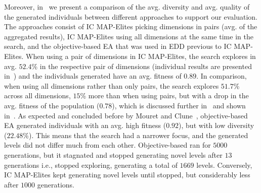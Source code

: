 Moreover, in~ we present a comparison of the avg. diversity and avg. quality of the generated individuals between different approaches to support our evaluation. The approaches consist of IC MAP-Elites picking dimensions in pairs (avg. of the aggregated results), IC MAP-Elites using all dimensions at the same time in the search, and the objective-based EA that was used in EDD previous to IC MAP-Elites. When using a pair of dimensions in IC MAP-Elites, the search explores in avg. $52.4$\% in the respective pair of dimensions (individual results are presented in~) and the individuals generated have an avg. fitness of $0.89$. In comparison, when using all dimensions rather than only pairs, the search explores $51.7$\% across all dimensions, $15$\% more than when using pairs, but with a drop in the avg. fitness of the population ($0.78$), which is discussed further in~ and shown in~. As expected and concluded before by Mouret and Clune~\cite{p6Mouret2015}, objective-based EA generated individuals with an avg. high fitness ($0.92$), but with low diversity ($22.48$\%). This means that the search had a narrower focus, and the generated levels did not differ much from each other. Objective-based ran for $5000$ generations, but it stagnated and stopped generating novel levels after $13$ generations i.e., stopped exploring, generating a total of $1669$ levels. Conversely, IC MAP-Elites kept generating novel levels until stopped, but considerably less after $1000$ generations.




